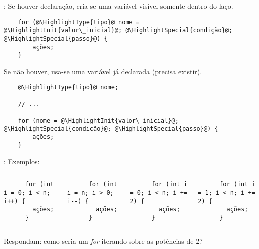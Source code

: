 \begin{frame}[fragile]{\insertsection: \insertsubsection}
  Se houver declaração, cria-se uma variável visível somente dentro do laço.
  \begin{verbatim}
    for (@\HighlightType{tipo}@ nome = @\HighlightInit{valor\_inicial}@; @\HighlightSpecial{condição}@; @\HighlightSpecial{passo}@) {
    	ações;
    }
  \end{verbatim}

  Se não houver, usa-se uma variável já declarada (precisa existir).
  \begin{verbatim}
    @\HighlightType{tipo}@ nome;

    // ...

    for (nome = @\HighlightInit{valor\_inicial}@; @\HighlightSpecial{condição}@; @\HighlightSpecial{passo}@) {
    	ações;
    }
  \end{verbatim}
\end{frame}


\begin{frame}[fragile]{\insertsection: \insertsubsection}
  Exemplos:
  \begin{columns}
    \begin{verbatim}
      for (int i = 0; i < n; i++) {
      	ações;
      }
    \end{verbatim}
    \begin{verbatim}
      for (int i = n; i > 0; i--) {
      	ações;
      }
    \end{verbatim}
    \begin{verbatim}
      for (int i = 0; i < n; i += 2) {
      	ações;
      }
    \end{verbatim}
    \begin{verbatim}
      for (int i = 1; i < n; i += 2) {
      	ações;
      }
    \end{verbatim}
  \end{columns}
  Respondam: como seria um \textit{for} iterando sobre as potências de 2?
\end{frame}
